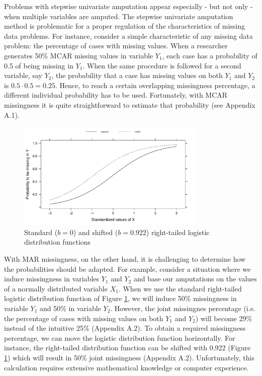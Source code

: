 \documentclass[11pt,a4paper]{article}
\begin{document}
Problems with stepwise univariate amputation appear especially - but not only - when multiple variables are amputed. The stepwise univariate amputation method is problematic for a proper regulation of the characteristics of missing data problems. For instance, consider a simple characteristic of any missing data problem: the percentage of cases with missing values. When a researcher generates 50\% MCAR missing values in variable $Y_1$, each case has a probability of 0.5 of being missing in $Y_1$. When the same procedure is followed for a second variable, say $Y_2$, the probability that a case has missing values on both $Y_1$ and $Y_2$ is $0.5 \cdot 0.5 = 0.25$. Hence, to reach a certain overlapping missingness percentage, a different individual probability has to be used. Fortunately, with MCAR missingness it is quite straightforward to estimate that probability (see Appendix A.1).

\begin{figure}[t!]
\centering
\includegraphics[width=0.8\textwidth]{Figures/types_shifted.pdf}
\caption{\small Standard ($b = 0$) and shifted ($b = 0.922$) right-tailed logistic distribution functions}
\label{types_shifted}
\end{figure}

With MAR missingness, on the other hand, it is challenging to determine how the probabilities should be adapted. For example, consider a situation where we induce missingness in variables $Y_1$ and $Y_2$ and base our amputations on the values of a normally distributed variable $X_1$. When we use the standard right-tailed logistic distribution function of Figure \ref{types_shifted}, we will induce 50\% missingness in variable $Y_1$ and 50\% in variable $Y_2$. However, the joint missingnes percentage (i.e. the percentage of cases with missing values on both $Y_1$ and $Y_2$) will become 29\% instead of the intuitive 25\% (Appendix A.2). To obtain a required missingness percentage, we can move the logistic distribution function horizontally. For instance, the right-tailed distribution function can be shifted with 0.922 (Figure \ref{types_shifted}) which will result in 50\% joint missingness (Appendix A.2). Unfortunately, this calculation requires extensive mathematical knowledge or computer experience. 
\end{document}
